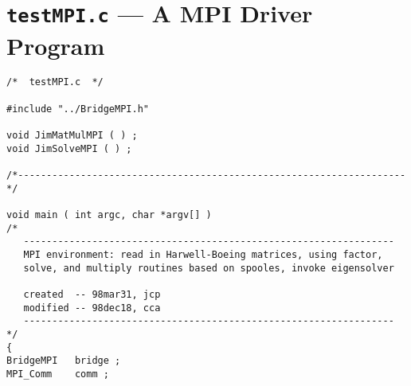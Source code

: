 \chapter{{\tt testMPI.c} --- A MPI Driver Program}
\label{chapter:MPI_driver}

\begin{verbatim}
/*  testMPI.c  */

#include "../BridgeMPI.h"

void JimMatMulMPI ( ) ;
void JimSolveMPI ( ) ;

/*--------------------------------------------------------------------*/

void main ( int argc, char *argv[] )
/*
   -----------------------------------------------------------------
   MPI environment: read in Harwell-Boeing matrices, using factor, 
   solve, and multiply routines based on spooles, invoke eigensolver

   created  -- 98mar31, jcp
   modified -- 98dec18, cca
   -----------------------------------------------------------------
*/
{
BridgeMPI   bridge ;
MPI_Comm    comm ;


\end{verbatim}
